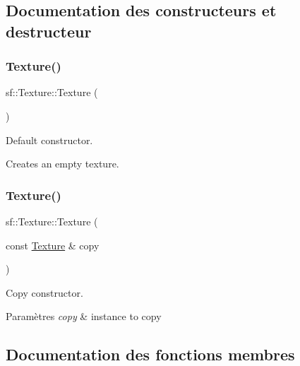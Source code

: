 \subsection{Documentation des constructeurs et destructeur}
\mbox{\label{classsf_1_1Texture_a3e04674853b8533bf981db3173e3a4a7}} 
\subsubsection{\texorpdfstring{Texture()}{Texture()}\hspace{0.1cm}{\footnotesize\ttfamily [1/2]}}
{\footnotesize\ttfamily sf\+::\+Texture\+::\+Texture (\begin{DoxyParamCaption}{ }\end{DoxyParamCaption})}



Default constructor. 

Creates an empty texture. \mbox{\label{classsf_1_1Texture_a524855cbf89de3b74be84d385fd229de}} 
\subsubsection{\texorpdfstring{Texture()}{Texture()}\hspace{0.1cm}{\footnotesize\ttfamily [2/2]}}
{\footnotesize\ttfamily sf\+::\+Texture\+::\+Texture (\begin{DoxyParamCaption}\item[{const \hyperlink{classsf_1_1Texture}{Texture} \&}]{copy }\end{DoxyParamCaption})}



Copy constructor. 


\begin{DoxyParams}{Paramètres}
{\em copy} & instance to copy \\
\hline
\end{DoxyParams}


\subsection{Documentation des fonctions membres}
\mbox{\label{classsf_1_1Texture_ae9a4274e7b95ebf7244d09c7445833b0}} 
